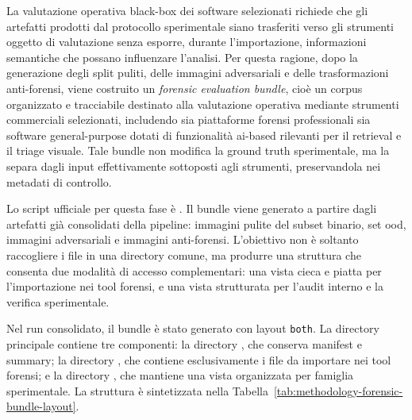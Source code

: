 La valutazione operativa black-box dei software selezionati richiede che gli
artefatti prodotti dal protocollo sperimentale siano trasferiti verso gli
strumenti oggetto di valutazione senza esporre, durante l'importazione,
informazioni semantiche che possano influenzare l'analisi. Per questa ragione,
dopo la generazione degli split puliti, delle immagini adversariali e delle
trasformazioni anti-forensi, viene costruito un \textit{forensic evaluation
bundle}, cioè un corpus organizzato e tracciabile destinato alla valutazione
operativa mediante strumenti commerciali selezionati, includendo sia piattaforme forensi
professionali sia software general-purpose dotati di funzionalità
\gls{ai}-based rilevanti per il retrieval e il triage visuale.
Tale bundle non modifica la ground truth sperimentale, ma la separa
dagli input effettivamente sottoposti agli strumenti, preservandola nei metadati
di controllo.

Lo script ufficiale per questa fase è
.
Il bundle viene generato a partire dagli artefatti già consolidati della pipeline:
immagini pulite del subset binario, set \gls{ood}, immagini adversariali e
immagini anti-forensi. L'obiettivo non è soltanto raccogliere i file in una
directory comune, ma produrre una struttura che consenta due modalità di accesso
complementari: una vista cieca e piatta per l'importazione nei tool forensi,
e una vista strutturata per l'audit interno e la verifica sperimentale.

Nel run consolidato, il bundle è stato generato con layout \texttt{both}. La
directory principale  contiene
tre componenti: la directory , che conserva manifest e summary;
la directory , che contiene esclusivamente i
file da importare nei tool forensi; e la directory
, che mantiene una vista organizzata per
famiglia sperimentale. La struttura è sintetizzata nella
Tabella~\ref{tab:methodology-forensic-bundle-layout}.

